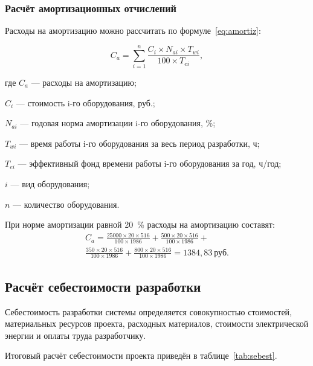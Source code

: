 \subsubsection{Расчёт амортизационных отчислений}

Расходы на амортизацию можно рассчитать по формуле~\ref{eq:amortiz}:

\begin{equation}
	\label{eq:amortiz}
	C_{a} = \sum^{n}_{i=1} \frac{C_i \times N_{ai} \times T_{wi}}{100 \times T_{ei}},
\end{equation}
\begin{ESKDexplanation}
	\item где $C_{a}$ --- расходы на амортизацию;
	\item $C_i$ --- стоимость i-го оборудования, руб.;
	\item $N_{ai}$ --- годовая норма амортизации i-го оборудования, \%;
	\item $T_{wi}$ --- время работы i-го оборудования за весь период разработки, ч;
	\item $T_{ei}$ --- эффективный фонд времени работы i-го оборудования за год, ч/год;
	\item $i$ --- вид оборудования;
	\item $n$ --- количество оборудования.
\end{ESKDexplanation}

При норме амортизации равной 20~\% расходы на амортизацию составят:
\begin{equation*}
\begin{split}
	C_{a} = 
	\frac{25000 \times 20 \times 516}{100 \times 1986} + 
	\frac{500 \times 20 \times 516}{100 \times 1986} + \\
	\frac{350 \times 20 \times 516}{100 \times 1986} + 
	\frac{800 \times 20 \times 516}{100 \times 1986} =
	1384,83~\text{руб}.
\end{split}
\end{equation*}

\subsection{Расчёт себестоимости разработки}

Себестоимость разработки системы определяется совокупностью стоимостей, материальных ресурсов проекта, расходных материалов, стоимости электрической энергии и оплаты труда разработчику.

Итоговый расчёт себестоимости проекта приведён в таблице~\ref{tab:sebest}.


